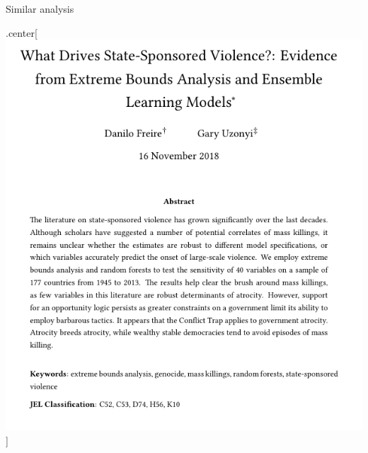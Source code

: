 \documentclass[ignorenonframetext,]{beamer}
\begin{document}
\begin{frame}{Similar analysis}

\begin{block}{.center{[}\includegraphics{freire01.png}{]}}

\end{block}

\end{frame}
\end{document}

